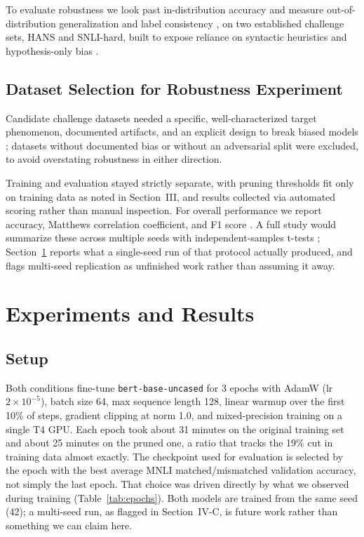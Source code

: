 \documentclass[conference]{IEEEtran}
\begin{document}
To evaluate robustness we look past in-distribution accuracy and measure out-of-distribution generalization and label consistency \cite{wang2022identifying}, on two established challenge sets, HANS and SNLI-hard, built to expose reliance on syntactic heuristics and hypothesis-only bias \cite{mccoy2019right, poliak2018hypothesis, gururangan2018annotation}.

\subsection{Dataset Selection for Robustness Experiment}

Candidate challenge datasets needed a specific, well-characterized target phenomenon, documented artifacts, and an explicit design to break biased models \cite{wang2022identifying}; datasets without documented bias or without an adversarial split were excluded, to avoid overstating robustness in either direction.

Training and evaluation stayed strictly separate, with pruning thresholds fit only on training data as noted in Section~III, and results collected via automated scoring rather than manual inspection. For overall performance we report accuracy, Matthews correlation coefficient, and F1 score \cite{wang2018glue}. A full study would summarize these across multiple seeds with independent-samples t-tests \cite{wu2022generating}; Section~\ref{sec:results} reports what a single-seed run of that protocol actually produced, and flags multi-seed replication as unfinished work rather than assuming it away.

\section{Experiments and Results}
\label{sec:results}

\subsection{Setup}

Both conditions fine-tune \texttt{bert-base-uncased} for 3 epochs with AdamW (lr $2\times10^{-5}$), batch size 64, max sequence length 128, linear warmup over the first 10\% of steps, gradient clipping at norm 1.0, and mixed-precision training on a single T4 GPU. Each epoch took about 31 minutes on the original training set and about 25 minutes on the pruned one, a ratio that tracks the 19\% cut in training data almost exactly. The checkpoint used for evaluation is selected by the epoch with the best average MNLI matched/mismatched validation accuracy, not simply the last epoch. That choice was driven directly by what we observed during training (Table~\ref{tab:epochs}). Both models are trained from the same seed (42); a multi-seed run, as flagged in Section~IV-C, is future work rather than something we can claim here.
\end{document}
